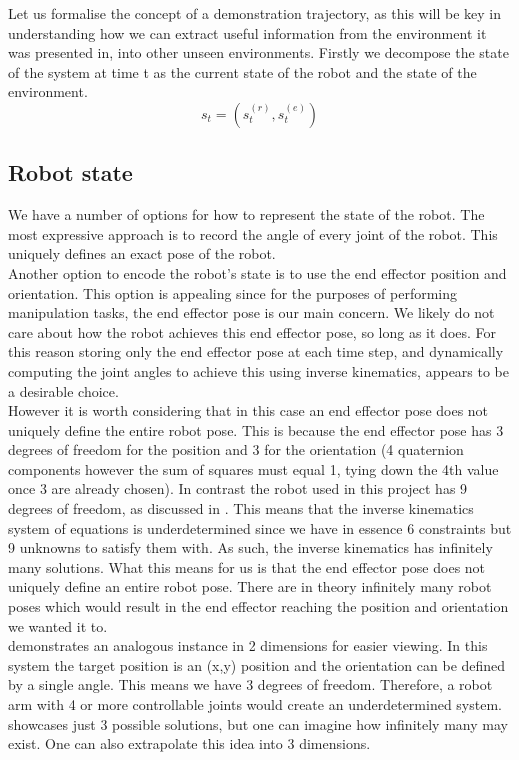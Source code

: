 Let us formalise the concept of a demonstration trajectory, as this will be key in understanding how we can extract useful information from the environment it was presented in, into other unseen environments. Firstly we decompose the state of the system at time t as the current state of the robot and the state of the environment.
$$s_t = (s^{(r)}_t, s^{(e)}_t)$$

\subsection{Robot state}
We have a number of options for how to represent the state of the robot. The most expressive approach is to record the angle of every joint of the robot. This uniquely defines an exact pose of the robot.
\\
Another option to encode the robot's state is to use the end effector position and orientation. This option is appealing since for the purposes of performing manipulation tasks, the end effector pose is our main concern. We likely do not care about how the robot achieves this end effector pose, so long as it does. For this reason storing only the end effector pose at each time step, and dynamically computing the joint angles to achieve this using inverse kinematics, appears to be a desirable choice.\\

However it is worth considering that in this case an end effector pose does not uniquely define the entire robot pose. This is because the end effector pose has 3 degrees of freedom for the position and 3 for the orientation (4 quaternion components however the sum of squares must equal 1, tying down the 4th value once 3 are already chosen). In contrast the robot used in this project has 9 degrees of freedom, as discussed in . This means that the inverse kinematics system of equations is underdetermined since we have in essence 6 constraints but 9 unknowns to satisfy them with. As such, the inverse kinematics has infinitely many solutions. What this means for us is that the end effector pose does not uniquely define an entire robot pose. There are in theory infinitely many robot poses which would result in the end effector reaching the position and orientation we wanted it to.\\

 demonstrates an analogous instance in 2 dimensions for easier viewing. In this system the target position is an (x,y) position and the orientation can be defined by a single angle. This means we have 3 degrees of freedom. Therefore, a robot arm with 4 or more controllable joints would create an underdetermined system.  showcases just 3 possible solutions, but one can imagine how infinitely many may exist. One can also extrapolate this idea into 3 dimensions.

